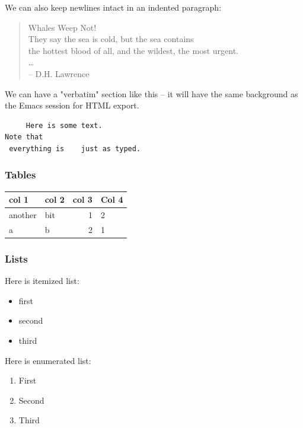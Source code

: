\documentclass[11pt]{article}
\begin{document}
We can also keep newlines intact in an indented paragraph:
\begin{verse}
Whales Weep Not! \\
\vspace*{1em}
They say the sea is cold, but the sea contains \\
the hottest blood of all, and the wildest, the most urgent. \\
\ldots{} \\
\vspace*{1em}
\hspace*{3em}-- D.H. Lawrence \\
\end{verse}

We can have a "verbatim" section like this -- it will have the same background as the Emacs session for HTML export.
\begin{verbatim}
     Here is some text.
Note that
 everything is    just as typed.
\end{verbatim}

\subsubsection{Tables}
\label{sec-2-2-2}

\begin{center}
\begin{tabular}{l|l|rl}
\hline
col 1 & col 2 & col 3 & Col 4\\
\hline
another & bit & 1 & 2\\
a & b & 2 & 1\\
\hline
\end{tabular}
\end{center}

\subsubsection{Lists}
\label{sec-2-2-3}

Here is itemized list:

\begin{itemize}
\item first
\item second
\item third
\end{itemize}

Here is enumerated list:

\begin{enumerate}
\item First
\item Second
\item Third
\end{enumerate}
\end{document}
